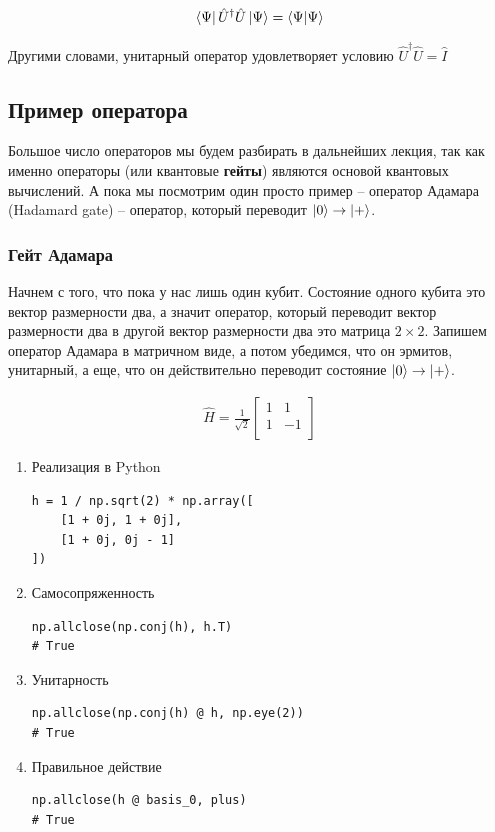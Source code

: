 \documentclass[11pt]{article}
\begin{document}
\begin{align*}
\bra{\Psi}\hat{U}^\dagger\hat{U}\ket{\Psi} = \bra{\Psi}\ket{\Psi}
\end{align*}

Другими словами, унитарный оператор удовлетворяет условию \(\hat{U}^\dagger \hat{U} = \hat{I}\)

\subsection{Пример оператора}
\label{sec:org0179b47}
Большое число операторов мы будем разбирать в дальнейших лекция, так как именно операторы (или квантовые \textbf{гейты}) являются основой квантовых вычислений. А пока мы посмотрим один просто пример -- оператор Адамара (Hadamard gate) -- оператор, который переводит \(\ket{0} \to \ket{+}\).

\subsubsection{Гейт Адамара}
\label{sec:org17c59cb}
Начнем с того, что пока у нас лишь один кубит. Состояние одного кубита это вектор размерности два, а значит оператор, который переводит вектор размерности два в другой вектор размерности два это матрица \(2\times 2\). Запишем оператор Адамара в матричном виде, а потом убедимся, что он эрмитов, унитарный, а еще, что он действительно переводит состояние \(\ket{0} \to \ket{+}\).

\begin{align*}
\hat{H} = \frac{1}{\sqrt{2}}\begin{bmatrix}
1 & 1 \\
1 & -1 \\
\end{bmatrix}
\end{align*}

\begin{enumerate}
\item Реализация в Python
\label{sec:org789bd2e}
\begin{verbatim}
h = 1 / np.sqrt(2) * np.array([
    [1 + 0j, 1 + 0j],
    [1 + 0j, 0j - 1]
])
\end{verbatim}

\item Самосопряженность
\label{sec:orge0b2776}
\begin{verbatim}
np.allclose(np.conj(h), h.T)
# True
\end{verbatim}

\item Унитарность
\label{sec:org0235033}
\begin{verbatim}
np.allclose(np.conj(h) @ h, np.eye(2))
# True
\end{verbatim}

\item Правильное действие
\label{sec:org39c4350}
\begin{verbatim}
np.allclose(h @ basis_0, plus)
# True
\end{verbatim}
\end{enumerate}
\end{document}

